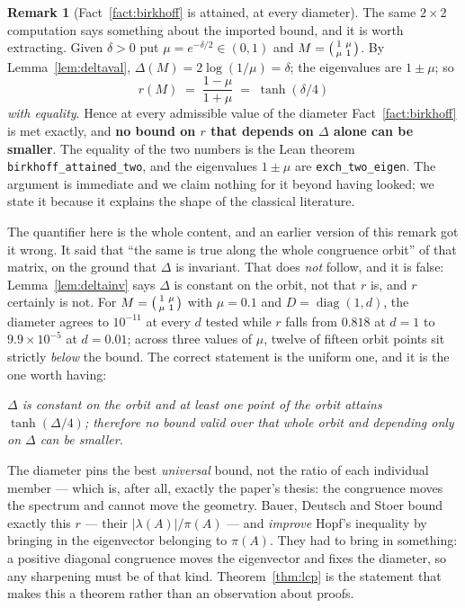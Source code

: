 \documentclass[11pt,a4paper]{article}
\theoremstyle{plain}
\theoremstyle{definition}
\newtheorem{remark}[theorem]{Remark}
\newcommand{\diag}{\operatorname{diag}}
\begin{document}
\begin{remark}[Fact~\ref{fact:birkhoff} is attained, at every diameter]\label{rem:sharp}
The same $2\times2$ computation says something about the imported bound, and it
is worth extracting. Given $\delta>0$ put $\mu=e^{-\delta/2}\in(0,1)$ and
$M=\begin{psmallmatrix}1&\mu\\ \mu&1\end{psmallmatrix}$. By
Lemma~\ref{lem:deltaval}, $\Delta(M)=2\log(1/\mu)=\delta$; the eigenvalues are
$1\pm\mu$; so
\[
  r(M)\;=\;\frac{1-\mu}{1+\mu}\;=\;\tanh(\delta/4)
\]
\emph{with equality}. Hence at every admissible value of the diameter
Fact~\ref{fact:birkhoff} is met exactly, and \textbf{no bound on $r$ that depends
on $\Delta$ alone can be smaller}. The equality of the two numbers is the Lean
theorem \verb|birkhoff_attained_two|, and the eigenvalues $1\pm\mu$ are
\verb|exch_two_eigen|. The argument is immediate and we claim nothing for it
beyond having looked; we state it because it explains the shape of the classical
literature.

The quantifier here is the whole content, and an earlier version of this remark
got it wrong. It said that ``the same is true along the whole congruence orbit''
of that matrix, on the ground that $\Delta$ is invariant. That does \emph{not}
follow, and it is false: Lemma~\ref{lem:deltainv} says $\Delta$ is constant on
the orbit, not that $r$ is, and $r$ certainly is not. For
$M=\begin{psmallmatrix}1&\mu\\ \mu&1\end{psmallmatrix}$ with $\mu=0.1$ and
$D=\diag(1,d)$, the diameter agrees to $10^{-11}$ at every $d$ tested while $r$
falls from $0.818$ at $d=1$ to $9.9\times10^{-5}$ at $d=0.01$; across three
values of $\mu$, twelve of fifteen orbit points sit strictly \emph{below} the
bound. The correct statement is the uniform one, and it is the one worth having:
\begin{center}
\emph{$\Delta$ is constant on the orbit and at least one point of the orbit
attains $\tanh(\Delta/4)$; therefore no bound valid over that whole orbit and
depending only on $\Delta$ can be smaller.}
\end{center}
The diameter pins the best \emph{universal} bound, not the ratio of each
individual member --- which is, after all, exactly the paper's thesis: the
congruence moves the spectrum and cannot move the geometry. Bauer, Deutsch and Stoer
\cite{bauerdeutschstoer1969} bound exactly this $r$ --- their
$|\lambda(A)|/\pi(A)$ --- and \emph{improve} Hopf's inequality by bringing in the
eigenvector belonging to $\pi(A)$. They had to bring in something: a positive
diagonal congruence moves the eigenvector and fixes the diameter, so any
sharpening must be of that kind. Theorem~\ref{thm:lcp} is the statement that
makes this a theorem rather than an observation about proofs.
\end{remark}
\end{document}
